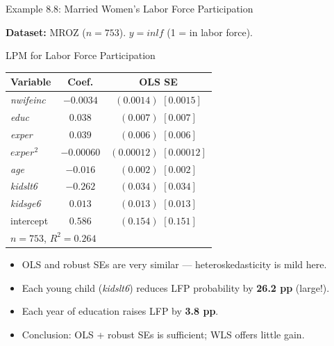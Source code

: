 \documentclass[aspectratio=169, 12pt]{beamer}
\begin{document}
\begin{frame}{Example 8.8: Married Women's Labor Force Participation}

  \textbf{Dataset:} MROZ ($n=753$). $y = \textit{inlf}$ (1 = in labor force).

  \begin{examplebox}{LPM for Labor Force Participation}
    \begin{center}
      \footnotesize
      \begin{tabular}{lcc}
        \toprule
        Variable & Coef. & OLS SE \quad [Robust SE] \\
        \midrule
        \textit{nwifeinc} & $-0.0034$ & $(0.0014)$ \quad $[0.0015]$ \\
        \textit{educ}     & $0.038$   & $(0.007)$ \quad $[0.007]$ \\
        \textit{exper}    & $0.039$   & $(0.006)$ \quad $[0.006]$ \\
        $\textit{exper}^2$& $-0.00060$ & $(0.00012)$ \quad $[0.00012]$ \\
        \textit{age}      & $-0.016$  & $(0.002)$ \quad $[0.002]$ \\
        \textit{kidslt6}  & $-0.262$  & $(0.034)$ \quad $[0.034]$ \\
        \textit{kidsge6}  & $0.013$   & $(0.013)$ \quad $[0.013]$ \\
        intercept         & $0.586$   & $(0.154)$ \quad $[0.151]$ \\
        \midrule
        \multicolumn{3}{l}{$n=753$, $R^2=0.264$} \\
        \bottomrule
      \end{tabular}
    \end{center}
  \end{examplebox}

  \begin{keybox}
    \begin{itemize}
      \item OLS and robust SEs are very similar — heteroskedasticity is mild here.
      \item Each young child (\textit{kidslt6}) reduces LFP probability by \textbf{26.2 pp} (large!).
      \item Each year of education raises LFP by \textbf{3.8 pp}.
      \item Conclusion: OLS + robust SEs is sufficient; WLS offers little gain.
    \end{itemize}
  \end{keybox}

\end{frame}
\end{document}
